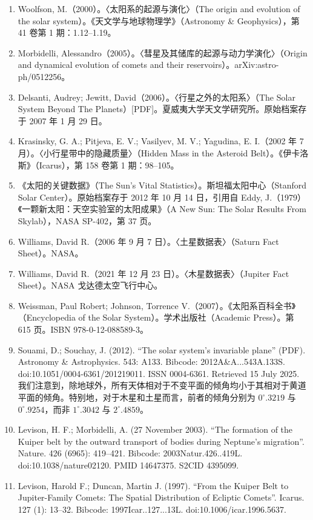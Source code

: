 \begin{enumerate}
\item Woolfson, M.（2000）。〈太阳系的起源与演化〉（The origin and evolution of the solar system）。《天文学与地球物理学》（Astronomy & Geophysics），第 41 卷第 1 期：1.12–1.19。
\item Morbidelli, Alessandro（2005）。〈彗星及其储库的起源与动力学演化〉（Origin and dynamical evolution of comets and their reservoirs）。arXiv:astro-ph/0512256。
\item Delsanti, Audrey; Jewitt, David（2006）。〈行星之外的太阳系〉（The Solar System Beyond The Planets）[PDF]。夏威夷大学天文学研究所。原始档案存于 2007 年 1 月 29 日。
\item Krasinsky, G. A.; Pitjeva, E. V.; Vasilyev, M. V.; Yagudina, E. I.（2002 年 7 月）。〈小行星带中的隐藏质量〉（Hidden Mass in the Asteroid Belt）。《伊卡洛斯》（Icarus），第 158 卷第 1 期：98–105。
\item 《太阳的关键数据》（The Sun's Vital Statistics）。斯坦福太阳中心（Stanford Solar Center）。原始档案存于 2012 年 10 月 14 日，引用自 Eddy, J.（1979）《一颗新太阳：天空实验室的太阳成果》（A New Sun: The Solar Results From Skylab），NASA SP-402，第 37 页。
\item Williams, David R.（2006 年 9 月 7 日）。〈土星数据表〉（Saturn Fact Sheet）。NASA。
\item Williams, David R.（2021 年 12 月 23 日）。〈木星数据表〉（Jupiter Fact Sheet）。NASA 戈达德太空飞行中心。
\item Weissman, Paul Robert; Johnson, Torrence V.（2007）。《太阳系百科全书》（Encyclopedia of the Solar System）。学术出版社（Academic Press）。第 615 页。ISBN 978-0-12-088589-3。
\item Souami, D.; Souchay, J. (2012). ``The solar system's invariable plane'' (PDF). Astronomy \& Astrophysics. 543: A133. Bibcode: 2012A\&A...543A.133S. doi:10.1051/0004-6361/201219011. ISSN 0004-6361. Retrieved 15 July 2025.  
我们注意到，除地球外，所有天体相对于不变平面的倾角均小于其相对于黄道平面的倾角。特别地，对于木星和土星而言，前者的倾角分别为 $0^\circ.3219$ 与 $0^\circ.9254$，而非 $1^\circ.3042$ 与 $2^\circ.4859$。
\item Levison, H. F.; Morbidelli, A. (27 November 2003). ``The formation of the Kuiper belt by the outward transport of bodies during Neptune's migration''. Nature. 426 (6965): 419–421. Bibcode: 2003Natur.426..419L. doi:10.1038/nature02120. PMID 14647375. S2CID 4395099.
\item Levison, Harold F.; Duncan, Martin J. (1997). ``From the Kuiper Belt to Jupiter-Family Comets: The Spatial Distribution of Ecliptic Comets''. Icarus. 127 (1): 13–32. Bibcode: 1997Icar..127...13L. doi:10.1006/icar.1996.5637.

\end{enumerate}
